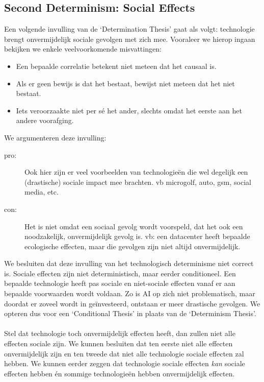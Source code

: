 \documentclass[../summary.tex]{subfiles}
\begin{document}
	\subsection{Second Determinism: Social Effects}
	Een volgende invulling van de `Determination Thesis' gaat als volgt: technologie brengt onvermijdelijk sociale gevolgen met zich mee. Vooraleer we hierop ingaan bekijken we enkele veelvoorkomende misvattingen:
	\begin{itemize}
		\item Een bepaalde correlatie betekent niet meteen dat het causaal is.
		\item Als er geen bewijs is dat het bestaat, bewijst niet meteen dat het niet bestaat.
		\item Iets veroorzaakte niet per sé het ander, slechts omdat het eerste aan het andere voorafging.
	\end{itemize}
	We argumenteren deze invulling:
	\begin{description}
		\item[pro:] Ook hier zijn er veel voorbeelden van technologieën die wel degelijk een (drastische) sociale impact mee brachten. vb microgolf, auto, gsm, social media, etc.
		\item[con:] Het is niet omdat een sociaal gevolg wordt voorspeld, dat het ook een noodzakelijk, onvermijdelijk gevolg is. vb: een datacenter heeft bepaalde ecologische effecten, maar die gevolgen zijn niet altijd onvermijdelijk. 
	\end{description}
	We besluiten dat deze invulling van het technologisch determinisme niet correct is. Sociale effecten zijn niet deterministisch, maar eerder conditioneel. Een bepaalde technologie heeft pas sociale en niet-sociale effecten vanaf er aan bepaalde voorwaarden wordt voldaan. Zo is AI op zich niet problematisch, maar doordat er zoveel wordt in geïnvesteerd, ontstaan er meer drastische gevolgen. We opteren dus voor een `Conditional Thesis' in plaats van de `Determinism Thesis'.\\
	\\
	Stel dat technologie toch onvermijdelijk effecten heeft, dan zullen niet alle effecten sociale zijn. We kunnen besluiten dat ten eerste niet alle effecten onvermijdelijk zijn en ten tweede dat niet alle technologie sociale effecten zal hebben. We kunnen eerder zeggen dat technologie sociale effecten \emph{kan} sociale effecten hebben én sommige technologieën hebben onvermijdelijk effecten. 
	
\end{document}
